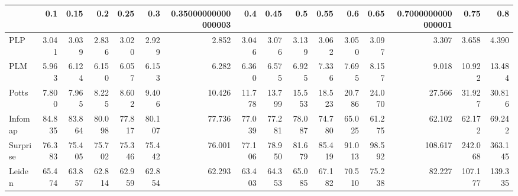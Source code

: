 \begin{tabular}{lrrrrrrrrrrrrrrr}
\toprule
{} &    0.1 &   0.15 &    0.2 &   0.25 &    0.3 & 0.35000000000000003 &    0.4 &   0.45 &    0.5 &   0.55 &    0.6 &   0.65 & 0.7000000000000001 &    0.75 &     0.8 \\
\midrule
PLP      &  3.041 &  3.039 &  2.836 &  3.020 &  2.929 &               2.852 &  3.046 &  3.076 &  3.139 &  3.062 &  3.050 &  3.097 &              3.307 &   3.658 &   4.390 \\
PLM      &  5.963 &  6.124 &  6.150 &  6.057 &  6.153 &               6.282 &  6.360 &  6.575 &  6.925 &  7.336 &  7.695 &  8.157 &              9.018 &  10.922 &  13.484 \\
Potts    &  7.800 &  7.965 &  8.225 &  8.602 &  9.406 &              10.426 & 11.778 & 13.799 & 15.553 & 18.523 & 20.786 & 24.070 &             27.566 &  31.927 &  30.816 \\
Infomap  & 84.835 & 83.864 & 80.098 & 77.817 & 80.107 &              77.736 & 77.039 & 77.281 & 78.087 & 74.780 & 65.025 & 61.275 &             62.102 &  62.172 &  69.242 \\
Surprise & 76.383 & 75.405 & 75.702 & 75.346 & 75.442 &              76.001 & 77.106 & 78.950 & 81.679 & 85.419 & 91.013 & 98.592 &            108.617 & 242.068 & 363.145 \\
Leiden   & 65.474 & 63.857 & 62.814 & 62.959 & 62.854 &              62.293 & 63.403 & 64.353 & 65.085 & 67.182 & 70.510 & 75.238 &             82.227 & 107.177 & 139.335 \\
\bottomrule
\end{tabular}
